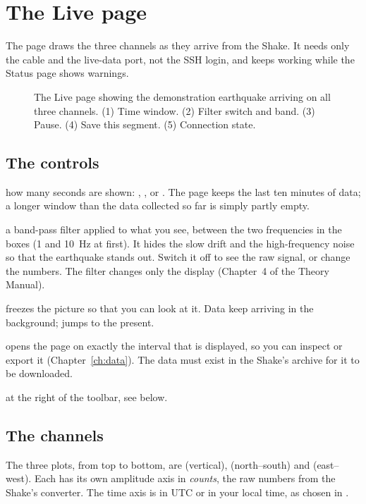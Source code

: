 \chapter{The Live page}\label{ch:live}

The  page draws the three channels as they arrive from the Shake. It needs only the cable and the live-data port, not
the SSH login, and keeps working while the Status page shows warnings.

\begin{figure}[tbp]
\centering
{}
\caption{The Live page showing the demonstration earthquake arriving on all three channels. (1) Time window. (2) Filter switch
and band. (3) Pause. (4) Save this segment. (5) Connection state.}\label{fig:live}
\end{figure}

\section{The controls}
\begin{description}[leftmargin=3.4cm,style=nextline]
\item[Window] how many seconds are shown: , ,  or . The page keeps the last ten minutes of data;
  a longer window than the data collected so far is simply partly empty.
\item[Filter] a band-pass filter applied to what you see, between the two frequencies in the boxes (1 and 10~Hz at first). It hides
  the slow drift and the high-frequency noise so that the earthquake stands out. Switch it off to see the raw signal, or change the
  numbers. The filter changes only the display (Chapter~4 of the Theory Manual).
\item[Pause] freezes the picture so that you can look at it. Data keep arriving in the background;  jumps to the present.
\item[Save this segment] opens the  page on exactly the interval that is displayed, so you can inspect or export it
  (Chapter~\ref{ch:data}). The data must exist in the Shake's archive for it to be downloaded.
\item[Connection state] at the right of the toolbar, see below.
\end{description}

\section{The channels}
The three plots, from top to bottom, are  (vertical),  (north--south) and  (east--west). Each has its own
amplitude axis in \emph{counts}, the raw numbers from the Shake's converter. The time axis is in UTC or in your local time,
as chosen in .

